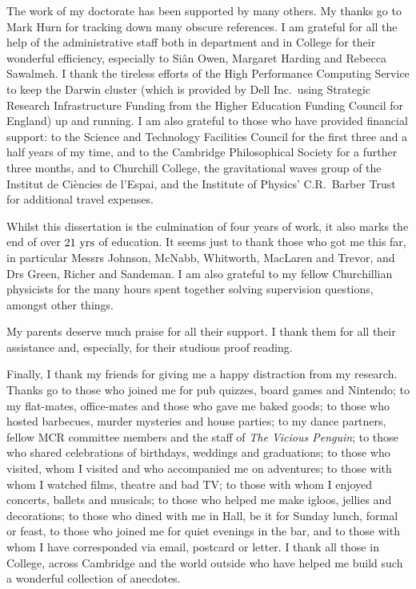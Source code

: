The work of my doctorate has been supported by many others. My thanks go to Mark Hurn for tracking down many obscure references. I am grateful for all the help of the administrative staff both in department and in College for their wonderful efficiency, especially to Si{\^a}n Owen, Margaret Harding and Rebecca Sawalmeh. I thank the tireless efforts of the High Performance Computing Service to keep the Darwin cluster (which is provided by Dell Inc.\ using Strategic Research Infrastructure Funding from the Higher Education Funding Council for England) up and running. I am also grateful to those who have provided financial support: to the Science and Technology Facilities Council for the first three and a half years of my time, and to the Cambridge Philosophical Society for a further three months, and to Churchill College, the gravitational waves group of the Institut de Ci{\`e}ncies de l'Espai, and the Institute of Physics' C.R.\ Barber Trust for additional travel expenses.

Whilst this dissertation is the culmination of four years of work, it also marks the end of over $21~\mathrm{yrs}$ of education. It seems just to thank those who got me this far, in particular Messrs Johnson, McNabb, Whitworth, MacLaren and Trevor, and Drs Green, Richer and Sandeman. I am also grateful to my fellow Churchillian physicists for the many hours spent together solving supervision questions, amongst other things.

My parents deserve much praise for all their support. I thank them for all their assistance and, especially, for their studious proof reading.

Finally, I thank my friends for giving me a happy distraction from my research. Thanks go to those who joined me for pub quizzes, board games and Nintendo; to my flat-mates, office-mates and those who gave me baked goods; to those who hosted barbecues, murder mysteries and house parties; to my dance partners, fellow MCR committee members and the staff of \textit{The Vicious Penguin}; to those who shared celebrations of birthdays, weddings and graduations; to those who visited, whom I visited and who accompanied me on adventures; to those with whom I watched films, theatre and bad TV; to those with whom I enjoyed concerts, ballets and musicals; to those who helped me make igloos, jellies and decorations; to those who dined with me in Hall, be it for Sunday lunch, formal or feast, to those who joined me for quiet evenings in the bar, and to those with whom I have corresponded via email, postcard or letter. I thank all those in College, across Cambridge and the world outside who have helped me build such a wonderful collection of anecdotes.

